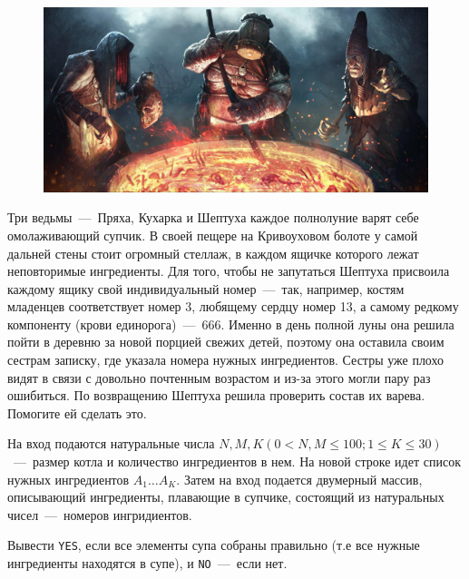 \begin{figure}[h!]
	\centering
	\includegraphics[width=\linewidth, keepaspectratio]{soup.jpg}
\end{figure}

Три ведьмы~---~Пряха, Кухарка и Шептуха каждое полнолуние варят себе омолаживающий супчик. 
В своей пещере на Кривоуховом болоте у самой дальней стены стоит огромный стеллаж, в каждом ящичке которого лежат неповторимые ингредиенты. 
Для того, чтобы не запутаться Шептуха присвоила каждому ящику свой индивидуальный номер~---~так, например, 
костям младенцев соответствует номер 3, любящему сердцу номер 13, а самому редкому компоненту (крови единорога)~---~666. 
Именно в день полной луны она решила пойти в деревню за новой порцией свежих детей, поэтому она оставила своим сестрам записку, где указала номера нужных ингредиентов. 
Сестры уже плохо видят в связи с довольно почтенным возрастом и из-за этого могли пару раз ошибиться. 
По возвращению Шептуха решила проверить состав их варева. Помогите ей сделать это.

\InputFile
\noindent
На вход подаются натуральные числа $N, M, K (0 < N, M \leq 100; 1 \le K \leq 30)$~---~размер котла и количество ингредиентов в нем.
На новой строке идет список нужных ингредиентов $A_1 \ldots A_K$.
Затем на вход подается двумерный массив, описывающий ингредиенты, плавающие в супчике, состоящий из натуральных чисел~---~номеров ингридиентов.


\OutputFile
\noindent

Вывести \texttt{YES}, если все элементы супа собраны правильно (т.е все нужные ингредиенты находятся в супе), и \texttt{NO}~---~если нет.

\SAMPLES
